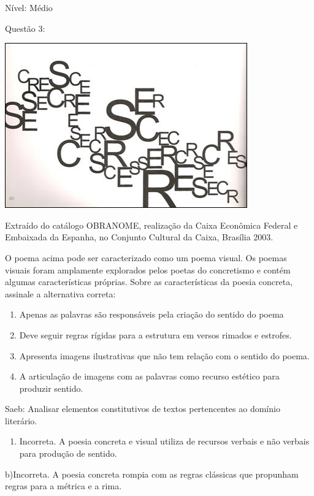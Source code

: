 {Nível: Médio

Questão 3:

\includegraphics[width=4.11458in,height=2.80208in]{./imgSAEB_7_POR/media/image3.png}

Extraído do catálogo OBRANOME, realização da Caixa Econômica Federal e
Embaixada da Espanha, no Conjunto Cultural da Caixa, Brasília 2003.

O poema acima pode ser caracterizado como um poema visual. Os poemas
visuais foram amplamente explorados pelos poetas do concretismo e contém
algumas características próprias. Sobre as características da poesia
concreta, assinale a alternativa correta:

\begin{enumerate}
\def\labelenumi{\arabic{enumi}.}
\item
  Apenas as palavras são responsáveis pela criação do sentido do poema
\item
  Deve seguir regras rígidas para a estrutura em versos rimados e
  estrofes.
\item
  Apresenta imagens ilustrativas que não tem relação com o sentido do
  poema.
\item
  A articulação de imagens com as palavras como recurso estético para
  produzir sentido.
\end{enumerate}

Saeb: Analisar elementos constitutivos de textos pertencentes ao domínio
literário.

\begin{enumerate}
\def\labelenumi{\arabic{enumi}.}
\tightlist
\item
  Incorreta. A poesia concreta e visual utiliza de recursos verbais e
  não verbais para produção de sentido.
\end{enumerate}

b)Incorreta. A poesia concreta rompia com as regras clássicas que
propunham regras para a métrica e a rima.

}
